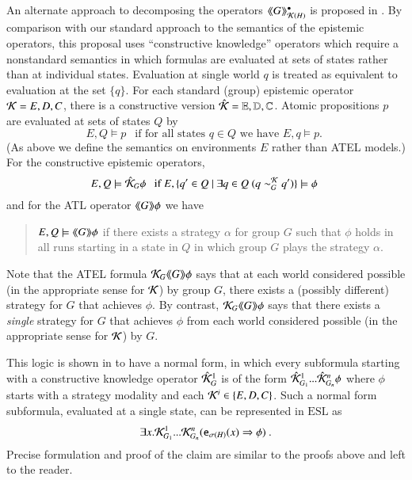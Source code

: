 \documentclass[a4wide]{article}
\newcommand{\ESL}{\mbox{ESL}}
\newcommand{\K}{{\cal K}}
\theoremstyle{examplesty}
\newcommand{\strat}{\sigma}
\newcommand{\atlop}[1]{\langle\hspace{-2pt}\langle #1 \rangle \hspace{-2pt}\rangle }
\newcommand{\existsg}[1]{\exists #1.}
\newcommand{\lid}[2]{\mathtt{e}_{#1}(#2)}
\newcommand{\rimp}{\Rightarrow}
\newcommand{\Env}{E}
\begin{document}
An alternate 
 approach to decomposing the operators $\atlop{G}^\bullet_{\mathcal{ K}(H)}$ is proposed in 
\cite{JA07}. 
 By comparison with our
 standard approach to the semantics of the epistemic operators, this  proposal  uses  ``constructive knowledge'' 
 operators which require a nonstandard semantics in which formulas are evaluated at sets of states rather than 
 at individual states. 
Evaluation at single world $q$ is treated as equivalent to evaluation at the set $\{q\}$. 
 For each standard (group) epistemic operator $\K = E,D,C$, there is a constructive version $\hat{\K} = \mathbb{E}, \mathbb{D}, \mathbb{C}$. 
 Atomic propositions $p$ are evaluated at sets of states $Q$ by 
 $$ \Env, Q \models p ~~\text{ if for all states $q\in Q$ we have $\Env,q \models p$. } $$ 
 (As above we define the semantics on environments $\Env$ rather than ATEL models.) 
For the constructive epistemic operators, 
 $$ \Env, Q \models \hat{\K}_G\phi ~~\text{ if  
$\Env,\{q'\in Q~|~\exists q\in Q~(q\sim^\K_G q') \}  \models \phi$ } $$  
 and for the ATL operator $\atlop{G}\phi$ we have 
 \begin{quote}
  $ \Env, Q \models \atlop{G}\phi $  if  there exists a strategy $\alpha$ for group $G$ such that $\phi$ holds in all runs 
  starting in a state in $Q$ in which group $G$ plays the strategy $\alpha$. 
  \end{quote}
Note that the ATEL formula 
  $\K_G\atlop{G}\phi $ says that at each world considered possible (in the appropriate sense for $\K$) by 
group $G$, there exists a (possibly different) strategy for  $G$ that achieves $\phi$. 
By contrast, $\K_G\atlop{G}\phi $ says that there exists a \emph{single} strategy for $G$ 
that achieves $\phi$ from each world considered possible (in the appropriate sense for $\K$) by $G$. 

This logic is shown in \cite{JAvH2008} to have a normal form, in which every subformula starting with a 
constructive knowledge operator $\hat{\K}^1_{G}$ is of the form $\hat{\K}^1_{G_1} ... \hat{\K}^n_{G_n}\phi$ where $\phi$ starts with a strategy modality and each 
$\K^i \in \{E,D,C\}$. Such a normal form subformula, evaluated at a single state, can be represented
in $\ESL$ as 
$$ \existsg{x}  \K^1_{G_1} ... \K^n_{G_n}(\lid{\strat(H)}{x} \rimp \phi)~. $$
 Precise formulation and proof of the claim are similar to the proofs above and left to the reader. 
 
\end{document}
